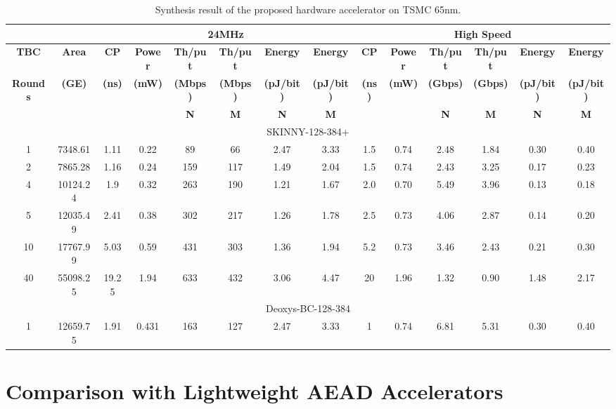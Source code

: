 \documentclass[conference]{IEEEtran}
\begin{document}
\begin{table}
  \centering
  \caption{Synthesis result of the proposed hardware accelerator on TSMC 65nm.}\label{tab:acc65nm}
  \begin{tabular}{c|c|c|c|c|c|c|c|c|c|c|c|c|c}\hline
    \multicolumn{2}{c|}{}&\multicolumn{6}{c|}{\textbf{24MHz}}&\multicolumn{6}{c}{\textbf{High Speed}} \\ \hline
    \textbf{TBC} & \textbf{Area} & \textbf{CP} & \textbf{Power} & \textbf{Th/put} &  \textbf{Th/put} & \textbf{Energy} & \textbf{Energy} & \textbf{CP} & \textbf{Power} & \textbf{Th/put} &  \textbf{Th/put} & \textbf{Energy} & \textbf{Energy}  \\ 
    \textbf{Rounds} & \textbf{(GE)} & \textbf{(ns)} & \textbf{(mW)} & \textbf{(Mbps)} & \textbf{(Mbps)} & \textbf{(pJ/bit)} &  \textbf{(pJ/bit)}  & \textbf{(ns)}& \textbf{(mW)} & \textbf{(Gbps)} & \textbf{(Gbps)} & \textbf{(pJ/bit)} &  \textbf{(pJ/bit)}   \\
    & & &  & \textbf{N} & \textbf{M} &\textbf{N} & \textbf{M}  && & \textbf{N} & \textbf{M} & \textbf{N} & \textbf{M}  \\ \hline \hline
    \multicolumn{14}{c}{SKINNY-128-384+} \\ \hline
    1  & 7348.61   & 1.11	  & 0.22    &  89 &  66 & 2.47	& 3.33 & 1.5 & 0.74 & 2.48 & 1.84 & 0.30 & 0.40 \\ 
    2	 & 7865.28	 & 1.16		& 0.24		& 159 & 117 & 1.49  & 2.04 & 1.5 & 0.74 & 2.43 & 3.25 & 0.17 & 0.23 \\ 
		4	 & 10124.24	 & 1.9		& 0.32		& 263 & 190 & 1.21  & 1.67 & 2.0 & 0.70 & 5.49 & 3.96 & 0.13 & 0.18 \\
    5	 & 12035.49	 & 2.41		& 0.38		& 302 & 217 & 1.26  & 1.78 & 2.5 & 0.73 & 4.06 & 2.87 & 0.14 & 0.20 \\ 
		10 & 17767.99	 & 5.03		& 0.59		& 431 & 303 & 1.36  & 1.94 & 5.2 & 0.73 & 3.46 & 2.43 & 0.21 & 0.30 \\ 
		40 & 55098.25	 & 19.25	& 1.94		& 633 & 432 & 3.06  & 4.47 & 20  & 1.96 & 1.32 & 0.90 & 1.48 & 2.17 \\ \hline\hline
    \multicolumn{14}{c}{Deoxys-BC-128-384} \\ \hline
    1  & 12659.75  & 1.91	  & 0.431   & 163 & 127 & 2.47	& 3.33 & 1   & 0.74 & 6.81 & 5.31 & 0.30 & 0.40  \\ \hline
  \end{tabular}
\end{table}

\section{Comparison with Lightweight AEAD Accelerators}
\end{document}
